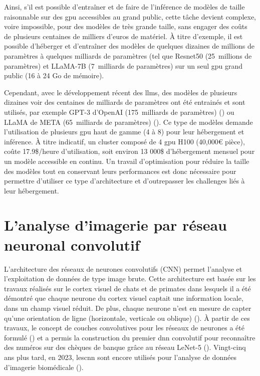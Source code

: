 Ainsi, s'il est possible d'entraîner et de faire de l'inférence de modèles de taille raisonnable sur des \gls{gpu} accessibles au grand public, cette tâche devient complexe, voire impossible, pour des modèles de très grande taille, sans engager des coûts de plusieurs centaines de milliers d'euros de matériel. À titre d'exemple, il est possible d'héberger et d'entraîner des modèles de quelques dizaines de millions de paramètres à quelques milliards de paramètres (tel que Resnet50 (25~millions de paramètres) et LLaMA-7B (7~milliards de paramètres) sur un seul \gls{gpu} grand public (16 à 24 Go de mémoire). 


Cependant, avec le développement récent des \gls{llms}, des modèles de plusieurs dizaines voir des centaines de milliards de paramètres ont été entrainés et sont utilisés, par exemple GPT-3 d'OpenAI (175~milliards de paramètres) (\cite{brown_language_2020}) ou LLaMA de META (65~milliards de paramètres) (\cite{touvron_llama_2023}). Ce type de modèles demande l'utilisation de plusieurs \gls{gpu} haut de gamme (4 à 8) pour leur hébergement et inférence. À titre indicatif, un cluster composé de 4 \gls{gpu} H100 (40,000€ pièce), coûte 17.9\$/heure d'utilisation, soit environ 13 000\$ d'hébergement mensuel pour un modèle accessible en continu. Un travail d'optimisation pour réduire la taille des modèles tout en conservant leurs performances est donc nécessaire pour permettre d'utiliser ce type d'architecture et d'outrepasser les challenges liés à leur hébergement.

\section{L'analyse d'imagerie par réseau neuronal convolutif}
L'architecture des réseaux de neurones convolutifs (CNN) permet l'analyse et l'exploitation de données de type image brute. Cette architecture est basée sur les travaux réalisés sur le cortex visuel de chats et de primates dans lesquels il a été démontré que chaque neurone du cortex visuel captait une information locale, dans un champ visuel réduit. De plus, chaque neurone n'est en mesure de capter qu'une orientation de ligne (horizontale, verticale ou oblique) (\cite{hubel_receptive_1959, hubel_single_1959}). À partir de ces travaux, le concept de couches convolutives pour les réseaux de neurones a été formulé (\cite{fukushima_neocognitron_1980}) et a permis la construction du premier \gls{dnn} convolutif pour reconnaître des numéros sur des chèques de banque grâce au réseau LeNet-5 (\cite{lecun_gradient-based_1998}). Vingt-cinq ans plus tard, en 2023, les\gls{cnn} sont encore utilisés pour l'analyse de données d'imagerie biomédicale (\cite{holscher_next-generation_2023, ker_automated_2019}).
 
